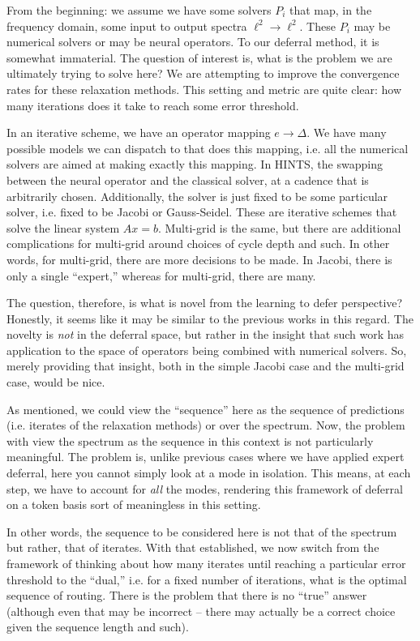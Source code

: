 \documentclass[12pt]{article}
\begin{document}
From the beginning: we assume we have some solvers $P_i$ that map, in the frequency domain, some input to output spectra $\ell^2\to\ell^2$. These $P_i$ may be numerical solvers or may be neural operators. To our deferral method, it is somewhat immaterial. The question of interest is, what is the problem we are ultimately trying to solve here? We are attempting to improve the convergence rates for these relaxation methods. This setting and metric are quite clear: how many iterations does it take to reach some error threshold. 

In an iterative scheme, we have an operator mapping $e\to\Delta$. We have many possible models we can dispatch to that does this mapping, i.e. all the numerical solvers are aimed at making exactly this mapping. In HINTS, the swapping between the neural operator and the classical solver, at a cadence that is arbitrarily chosen. Additionally, the solver is just fixed to be some particular solver, i.e. fixed to be Jacobi or Gauss-Seidel. These are iterative schemes that solve the linear system $Ax = b$. Multi-grid is the same, but there are additional complications for multi-grid around choices of cycle depth and such. In other words, for multi-grid, there are more decisions to be made. In Jacobi, there is only a single ``expert,'' whereas for multi-grid, there are many.

The question, therefore, is what is novel from the learning to defer perspective? Honestly, it seems like it may be similar to the previous works in this regard. The novelty is \textit{not} in the deferral space, but rather in the insight that such work has application to the space of operators being combined with numerical solvers. So, merely providing that insight, both in the simple Jacobi case and the multi-grid case, would be nice. 

As mentioned, we could view the ``sequence'' here as the sequence of predictions (i.e. iterates of the relaxation methods) or over the spectrum. Now, the problem with view the spectrum as the sequence in this context is not particularly meaningful. The problem is, unlike previous cases where we have applied expert deferral, here you cannot simply look at a mode in isolation. This means, at each step, we have to account for \textit{all} the modes, rendering this framework of deferral on a token basis sort of meaningless in this setting.

In other words, the sequence to be considered here is not that of the spectrum but rather, that of iterates. With that established, we now switch from the framework of thinking about how many iterates until reaching a particular error threshold to the ``dual,'' i.e. for a fixed number of iterations, what is the optimal sequence of routing. There is the problem that there is no ``true'' answer (although even that may be incorrect -- there may actually be a correct choice given the sequence length and such).
\end{document}
